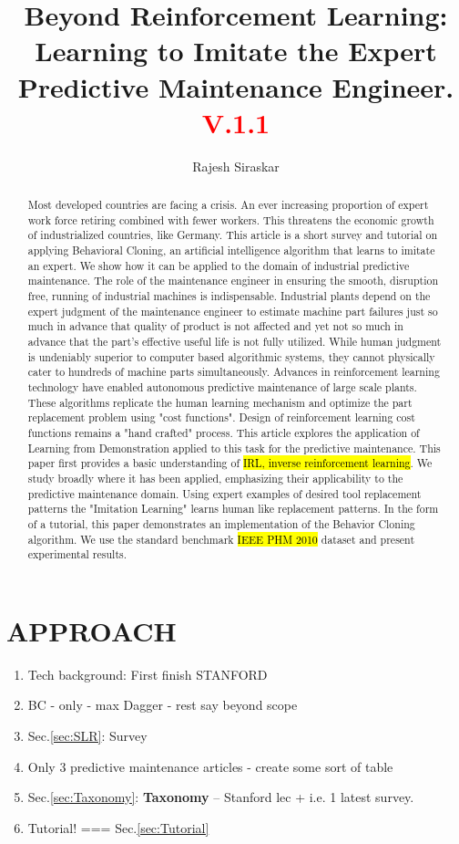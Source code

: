\documentclass{article}
\title{Beyond Reinforcement Learning: Learning to Imitate the Expert Predictive Maintenance Engineer.\\\textcolor{red}{\normalsize{V.1.1}}}
\author{Rajesh Siraskar}
\newcommand{\hlc}[2][blue!10]{{\colorlet{foo}{#1} \sethlcolor{foo}\hl{#2}}}
\begin{document}
\maketitle
\begin{abstract}
	Most developed countries are facing a crisis. An ever increasing proportion of expert work force retiring combined with fewer workers. This threatens the economic growth of industrialized countries, like Germany. This article is a short survey and tutorial on applying Behavioral Cloning, an artificial intelligence algorithm that learns to imitate an expert. We show how it can be applied to the domain of industrial predictive maintenance. The role of the maintenance engineer in ensuring the smooth, disruption free, running of industrial machines is indispensable. Industrial plants depend on the expert judgment of the maintenance engineer to estimate machine part failures just so much in advance that quality of product is not affected and yet not so much in advance that the part's effective useful life is not fully utilized. While human judgment is undeniably superior to computer based algorithmic systems, they cannot physically cater to hundreds of machine parts simultaneously. Advances in reinforcement learning technology have enabled autonomous predictive maintenance of large scale plants. These algorithms replicate the human learning mechanism and optimize the part replacement problem using "cost functions". Design of reinforcement learning cost functions remains a "hand crafted" process. This article explores the application of Learning from Demonstration applied to this task for the predictive maintenance. This paper first provides a basic understanding of \hlc{IRL, inverse reinforcement learning}. We study broadly where it has been applied, emphasizing their applicability to the predictive maintenance domain. Using expert examples of desired tool replacement patterns the "Imitation Learning" learns human like replacement patterns. In the form of a tutorial, this paper demonstrates an implementation of the Behavior Cloning algorithm. We use the standard benchmark \hlc{IEEE PHM 2010} dataset and present experimental results.
\end{abstract}

\clearpage
\section{APPROACH}
\begin{enumerate}
	\item Tech background: First finish STANFORD
	\item \quad BC - only - max Dagger - rest say beyond scope
	\item Sec.\ref{sec:SLR}: Survey
	\item \quad Only 3 predictive maintenance  articles - create some sort of table
	\item \quad Sec.\ref{sec:Taxonomy}: \textbf{Taxonomy} -- Stanford lec + \cite{zare2024survey} i.e. 1 latest survey.
	\item Tutorial! === Sec.\ref{sec:Tutorial}
\end{enumerate}
\end{document}
